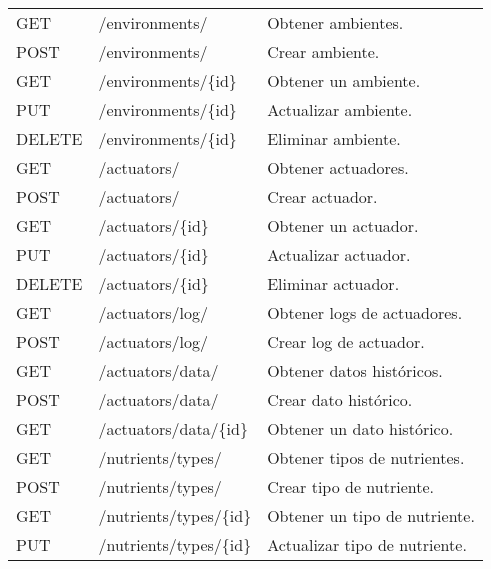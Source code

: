 \begin{table}[H]
\begin{tabular}{l l l}
        \midrule
        GET             & /environments/                   & Obtener ambientes.            \\
        POST            & /environments/                   & Crear ambiente.               \\
        GET             & /environments/\{id\}             & Obtener un ambiente.          \\
        PUT             & /environments/\{id\}             & Actualizar ambiente.          \\
        DELETE          & /environments/\{id\}             & Eliminar ambiente.            \\
        \midrule
        GET             & /actuators/                      & Obtener actuadores.           \\
        POST            & /actuators/                      & Crear actuador.               \\
        GET             & /actuators/\{id\}                & Obtener un actuador.          \\
        PUT             & /actuators/\{id\}                & Actualizar actuador.          \\
        DELETE          & /actuators/\{id\}                & Eliminar actuador.            \\
        \midrule
        GET             & /actuators/log/                  & Obtener logs de actuadores.   \\
        POST            & /actuators/log/                  & Crear log de actuador.        \\
        \midrule
        GET             & /actuators/data/                 & Obtener datos históricos.     \\
        POST            & /actuators/data/                 & Crear dato histórico.         \\
        GET             & /actuators/data/\{id\}           & Obtener un dato histórico.    \\
        \midrule
        GET             & /nutrients/types/                & Obtener tipos de nutrientes.  \\
        POST            & /nutrients/types/                & Crear tipo de nutriente.      \\
        GET             & /nutrients/types/\{id\}          & Obtener un tipo de nutriente. \\
        PUT             & /nutrients/types/\{id\}          & Actualizar tipo de nutriente. \\

\end{tabular}
\end{table}
